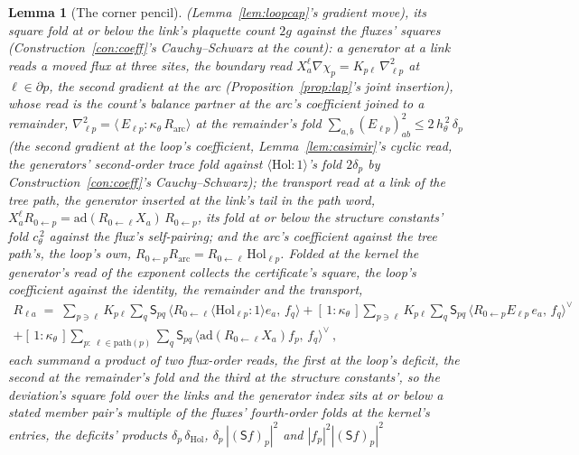 \documentclass[11pt]{article}
\newtheorem{lemma}{Lemma}
\theoremstyle{definition}
\begin{document}
\begin{lemma}[The corner pencil]
(Lemma~\ref{lem:loopcap}'s gradient move), its square fold at or
below the link's plaquette count $2g$ against the fluxes' squares
(Construction~\ref{con:coeff}'s Cauchy--Schwarz at the count): a
generator at a link reads a
moved flux at three sites, the boundary read
$X_a^{\ell}\nabla\chi_p=K_{p\ell}\,\nabla^{2}_{\ell p}$ at
$\ell\in\partial p$, the second gradient at the arc
(Proposition~\ref{prop:lap}'s joint insertion), whose read is the
count's balance partner at the arc's coefficient joined to a
remainder, $\nabla^{2}_{\ell p}=\langle\,E_{\ell p}:\kappa_\theta\,
R_{\mathrm{arc}}\rangle$ at the remainder's fold
$\sum_{a,b}(E_{\ell p})_{ab}^{2}\le2\,h_\theta^{\,2}\,\delta_p$
(the second gradient at the loop's coefficient,
Lemma~\ref{lem:casimir}'s cyclic read, the generators' second-order
trace fold against $\langle\mathrm{Hol}\!:\!1\rangle$'s fold
$2\delta_p$ by Construction~\ref{con:coeff}'s Cauchy--Schwarz); the
transport read at a link of the tree path, the generator inserted
at the link's tail in the path word,
$X_a^{\ell}R_{0\leftarrow p}=\mathrm{ad}(R_{0\leftarrow\ell}X_a)\,
R_{0\leftarrow p}$, its fold at or below the structure constants'
fold $c_\theta^{\,2}$ against the flux's self-pairing; and the arc's
coefficient against the tree path's, the loop's own,
$R_{0\leftarrow p}R_{\mathrm{arc}}=R_{0\leftarrow\ell}\,\mathrm{Hol}_{\ell p}$.
Folded at the kernel the generator's read of the exponent collects
the certificate's square, the loop's coefficient against the
identity, the remainder and the transport,
\begin{multline*}
R_{\ell a}\;=\;\sum_{p\ni\ell}K_{p\ell}\sum_q\mathsf S_{pq}\,
\big\langle R_{0\leftarrow\ell}\langle\mathrm{Hol}_{\ell p}\!:\!1\rangle e_a,\,f_q\big\rangle
+[\,1:\kappa_\theta\,]\sum_{p\ni\ell}K_{p\ell}\sum_q\mathsf S_{pq}\,
\big\langle R_{0\leftarrow p}E_{\ell p}\,e_a,\,f_q\big\rangle^{\!\vee}\\
+[\,1:\kappa_\theta\,]\sum_{p:\ \ell\in\text{path}(p)}\sum_q\mathsf S_{pq}\,
\big\langle\mathrm{ad}(R_{0\leftarrow\ell}X_a)f_p,\,f_q\big\rangle^{\!\vee}\ ,
\end{multline*}
each summand a product of two flux-order reads, the first at the
loop's deficit, the second at the remainder's fold and the third at
the structure constants', so the deviation's square fold over the
links and the generator index sits at or below a stated member
pair's multiple of the fluxes' fourth-order folds at the kernel's
entries, the deficits' products $\delta_p\,\delta_{\mathrm{Hol}}$,
$\delta_p\,|(\mathsf Sf)_p|^{2}$ and $|f_p|^{2}|(\mathsf Sf)_p|^{2}$

\end{lemma}
\end{document}
